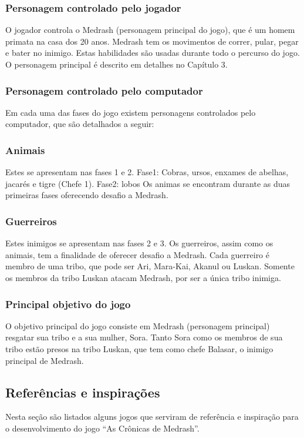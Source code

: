 \subsubsection{Personagem controlado pelo jogador}
O jogador controla o Medrash (personagem principal do jogo), que é um 
homem primata na casa dos 20 anos. Medrash tem os movimentos de correr, pular, 
pegar e bater no inimigo. Estas habilidades são usadas durante todo o percurso do jogo. 
O personagem principal é descrito em detalhes no Capítulo 3.

\subsubsection{Personagem controlado pelo computador}
Em cada uma das fases do jogo existem personagens controlados pelo computador, que 
são detalhados a seguir:


\subsubsection{Animais}
Estes se apresentam nas fases 1 e 2.
Fase1: Cobras, ursos, enxames de abelhas, jacarés e tigre (Chefe 1).
Fase2: lobos
Os animas se encontram durante as duas primeiras fases oferecendo desafio a Medrash. 

\subsubsection{Guerreiros}
Estes inimigos se apresentam nas fases 2 e 3. Os guerreiros, assim como os animais, 
tem a finalidade de oferecer desafio a Medrash. Cada guerreiro é membro de uma tribo, 
que pode ser Ari, Mara-Kai, Akanul ou Luskan. Somente os membros da tribo Luskan atacam 
Medrash, por ser a única tribo inimiga. 

\subsubsection{Principal objetivo do jogo}
O objetivo principal do jogo consiste em Medrash (personagem principal) resgatar 
sua tribo e a sua mulher, Sora. Tanto Sora como os membros de sua tribo 
estão presos na tribo Luskan, que tem como chefe Balasar, o inimigo principal de Medrash. 

\subsection{Referências e inspirações}
Nesta seção são listados alguns jogos que serviram de referência e inspiração 
para o desenvolvimento do jogo ``As Crônicas de Medrash''.

